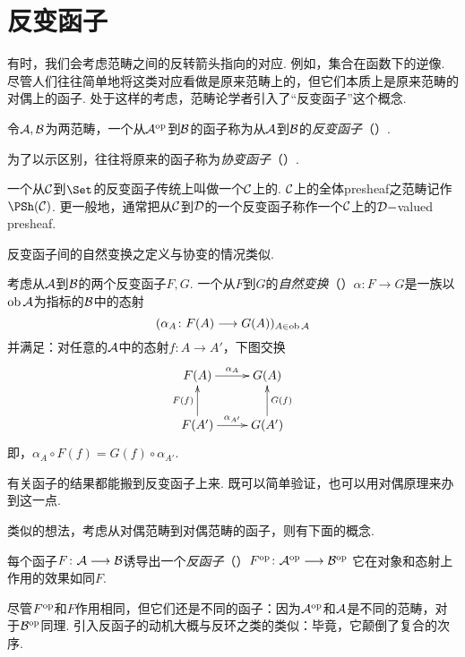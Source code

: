 \section{反变函子}
  有时，我们会考虑范畴之间的反转箭头指向的对应. 例如，集合在函数下的逆像. 尽管人们往往简单地将这类对应看做是原来范畴上的，但它们本质上是原来范畴的对偶上的函子.
  处于这样的考虑，范畴论学者引入了``反变函子''这个概念.
  \begin{defn}
    令${\cal A}, {\cal B}$为两范畴，一个从${\cal A}^{\operatorname{op}}$到${\cal B}$的函子称为从${\cal A}$到${\cal B}$的\emph{反变函子}（）.
  \end{defn}
  为了以示区别，往往将原来的函子称为\emph{协变函子}（）.
  \begin{exam}
   一个从${\cal C}$到$\Set$的反变函子传统上叫做一个${\cal C}$上的. ${\cal C}$上的全体presheaf之范畴记作$\PSh(\Cc)$. 更一般地，通常把从${\cal C}$到${\cal D}$的一个反变函子称作一个${\cal C}$上的${\cal D}-$valued presheaf.
  \end{exam}
  反变函子间的自然变换之定义与协变的情况类似.
  \begin{defn}
    考虑从${\cal A}$到${\cal B}$的两个反变函子$F,G$. 一个从$F$到$G$的\emph{自然变换}（）$\alpha\colon F\to G$是一族以$\operatorname{ob}{\cal A}$为指标的${\cal B}$中的态射
    \begin{equation*}
    (\alpha_A\colon F(A)\longrightarrow G(A))_{A\in\operatorname{ob}{\cal A}}
    \end{equation*}
    并满足：对任意的${\cal A}$中的态射$f\colon A \to A'$，下图交换
    \begin{displaymath}
      \xymatrix{
         F(A)\ar[r]^{\alpha_A}&G(A)\\
         F(A')\ar[r]^{\alpha_{A'}}\ar[u]^{F(f)}&G(A')\ar[u]_{G(f)}
      }
    \end{displaymath}
    即，$\alpha_{A}\circ F(f) = G(f) \circ \alpha_{A'}$.
  \end{defn}

  有关函子的结果都能搬到反变函子上来. 既可以简单验证，也可以用对偶原理来办到这一点.

  类似的想法，考虑从对偶范畴到对偶范畴的函子，则有下面的概念.
  \begin{defn}
    每个函子$F\colon{\cal A}\longrightarrow{\cal B}$诱导出一个\emph{反函子}（）$F^{\operatorname{op}}\colon {\cal A}^{\operatorname{op}} \longrightarrow {\cal B}^{\operatorname{op}}$ 它在对象和态射上作用的效果如同$F$.  
  \end{defn}
  尽管$F^{\operatorname{op}}$和$F$作用相同，但它们还是不同的函子：因为${\cal A}^{\operatorname{op}}$和${\cal A}$是不同的范畴，对于${\cal B}^{\operatorname{op}}$同理. 引入反函子的动机大概与反环之类的类似：毕竟，它颠倒了复合的次序.

